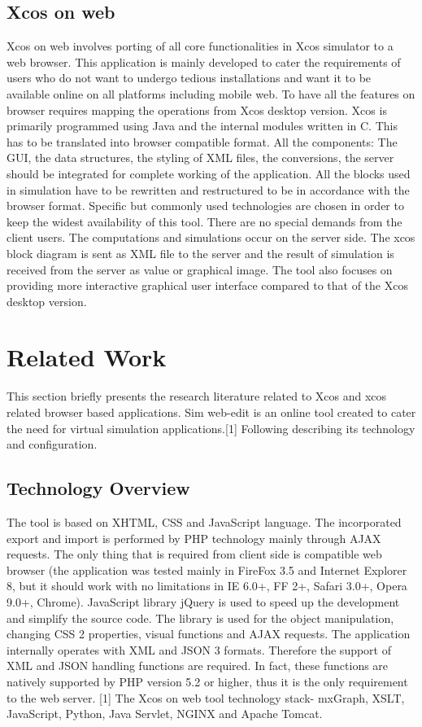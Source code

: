 \documentclass[conference]{IEEEtran}
\begin{document}
\subsection{Xcos on web}
Xcos on web involves porting of all core functionalities in Xcos simulator to a web browser. This application is mainly developed to cater the requirements of users who do not want to undergo tedious installations and want it to be available online on all platforms including mobile web. To have all the features on browser requires mapping the operations from Xcos desktop version. Xcos is primarily programmed using Java and the internal modules written in C. This has to be translated into browser compatible format. All the components: The GUI, the data structures, the styling of XML files, the conversions, the server should be integrated for complete working of the application. All the blocks used in simulation have to be rewritten and restructured to be in accordance with the browser format. Specific but commonly used technologies are chosen in order to keep the widest availability of this tool. There are no special demands from the client users. The computations and simulations occur on the server side. The xcos block diagram is sent as XML file to the server and the result of simulation is received from the server as value or graphical image. The tool also focuses on providing more interactive graphical user interface compared to that of the Xcos desktop version.

\section{Related Work}
This section briefly presents the research literature related to Xcos and xcos related browser based applications. 
Sim web-edit is an online tool created to cater the need for virtual simulation applications.[1] Following describing its technology and configuration.

\subsection{Technology Overview}
The tool is based on XHTML, CSS and JavaScript
language. The incorporated export and import is performed
by PHP technology mainly through AJAX requests. The only thing that is required from client side is compatible web browser (the application was tested mainly in FireFox 3.5 and Internet Explorer 8, but it should work with no limitations in IE 6.0+, FF 2+, Safari 3.0+, Opera 9.0+,
Chrome). JavaScript library jQuery is used to speed up the development
and simplify the source code. The library is used for the
object manipulation, changing CSS 2 properties, visual
functions and AJAX requests. The application internally operates with XML and JSON 3 formats. Therefore the support of XML and JSON handling
functions are required. In fact, these functions are natively
supported by PHP version 5.2 or higher, thus it is the only
requirement to the web server. [1] The Xcos on web tool technology stack- mxGraph, XSLT, JavaScript, Python, Java Servlet, NGINX and Apache Tomcat.
\end{document}
